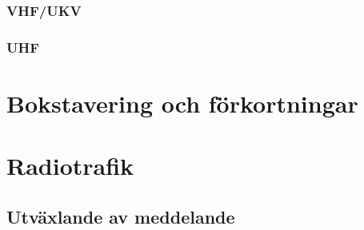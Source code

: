 \documentclass[12pt,swedish,a4paper,twoside]{report}
\begin{document}
\subsection{VHF/UKV}

\subsection{UHF}

\chapter{Bokstavering och förkortningar}


\chapter{Radiotrafik}

\section{Utväxlande av meddelande}

\clearpage
\tableofcontents
\clearpage

\setlength{\parskip}{0.5em}
\setlength{\parindent}{0pt}

%
\end{document}

